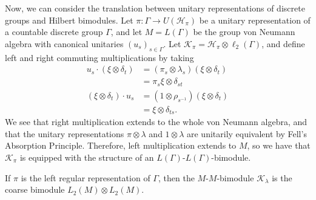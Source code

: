 \documentclass[10pt]{mypackage}
\begin{document}
Now, we can consider the translation between unitary representations of discrete groups and Hilbert bimodules. Let $\pi\colon \Gamma\rightarrow U\left( \mathcal{H}_{\pi} \right)$ be a unitary representation of a countable discrete group $\Gamma$, and let $M = L\left( \Gamma \right)$ be the group von Neumann algebra with canonical unitaries $\left( u_s \right)_{s\in\Gamma}$. Let $\mathcal{K}_{\pi} = \mathcal{H}_{\pi}\otimes \ell_2\left( \Gamma \right)$, and define left and right commuting multiplications by taking
\begin{align*}
  u_s\cdot \left( \xi\otimes \delta_t \right) &= \left( \pi_s\otimes\lambda_s \right)\left( \xi\otimes\delta_t \right)\\
                                              &= \pi_s\xi\otimes\delta_{st}\\
  \left( \xi\otimes\delta_t \right)\cdot u_s &= \left( 1\otimes \rho_{s^{-1}} \right)\left( \xi\otimes\delta_t \right)\\
                                             &= \xi\otimes\delta_{ts}.
\end{align*}
We see that right multiplication extends to the whole von Neumann algebra, and that the unitary representations $\pi\otimes\lambda$ and $1\otimes\lambda$ are unitarily equivalent by Fell's Absorption Principle. Therefore, left multiplication extends to $M$, so we have that $\mathcal{K}_{\pi}$ is equipped with the structure of an $L\left( \Gamma \right)$-$L\left( \Gamma \right)$-bimodule.

If $\pi$ is the left regular representation of $\Gamma$, then the $M$-$M$-bimodule $\mathcal{K}_{\lambda}$ is the coarse bimodule $L_2\left( M \right)\otimes L_2\left( M \right)$.
\nocite{paulsen_completely_bounded_maps,brown_and_ozawa,von_neumann_algebras_peterson,takesaki_1,ii1_factors_anantharaman_popa}
\printbibliography
\end{document}
